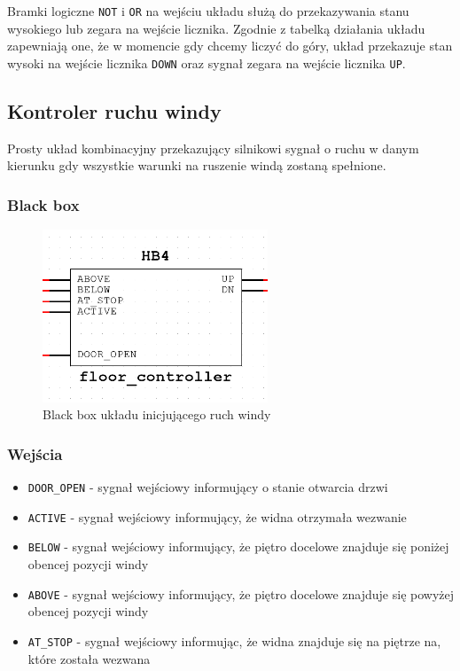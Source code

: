 \documentclass[a4paper]{article}
\begin{document}
Bramki logiczne \verb|NOT| i \verb|OR| na wejściu układu służą do przekazywania stanu wysokiego 
lub zegara na wejście licznika. Zgodnie z tabelką działania układu zapewniają one, że 
w momencie gdy chcemy liczyć do góry, układ przekazuje stan wysoki na wejście licznika \verb|DOWN|
oraz sygnał zegara na wejście licznika \verb|UP|.

\pagebreak

\subsection{Kontroler ruchu windy}

Prosty układ kombinacyjny przekazujący silnikowi sygnał o ruchu w danym kierunku gdy wszystkie warunki
na ruszenie windą zostaną spełnione.

\subsubsection{Black box}
\begin{figure}[H]
    \centering
    \includegraphics[width=0.6\textwidth]{floor_controller.png}
    \caption{Black box układu inicjującego ruch windy}
\end{figure}

\subsubsection{Wejścia}
\begin{itemize}
    \item \verb|DOOR_OPEN| - sygnał wejściowy informujący o stanie otwarcia drzwi
    \item \verb|ACTIVE| - sygnał wejściowy informujący, że widna otrzymała wezwanie
    \item \verb|BELOW| - sygnał wejściowy informujący, że piętro docelowe znajduje się poniżej obencej pozycji windy
    \item \verb|ABOVE| - sygnał wejściowy informujący, że piętro docelowe znajduje się powyżej obencej pozycji windy
    \item \verb|AT_STOP| - sygnał wejściowy informując, że widna znajduje się na piętrze na, które została wezwana
\end{itemize}
\end{document}

